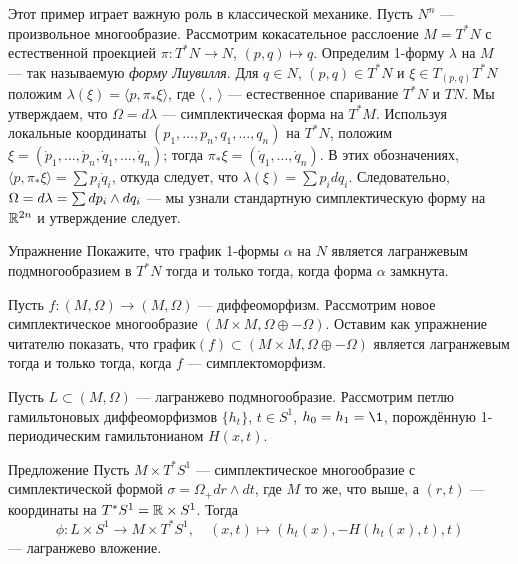 Этот пример играет важную роль в классической механике.
Пусть $N^n$ --- произвольное многообразие.
Рассмотрим кокасательное расслоение $M = T^\ast N$ с естественной проекцией $\pi\colon T^\ast N \to N$, $(p, q) \mapsto q$.
Определим 1-форму $\lambda$ на $M$ --- так называемую \emph{форму Лиувилля}.
Для $q \in N$, $(p, q) \in T^\ast N$ и $\xi \in T_{(p, q)} T^\ast N$ положим $\lambda (\xi) = \langle p, \pi_\ast \xi \rangle$, где $\langle\ ,\ \rangle$ --- естественное спаривание $T^\ast N$ и $TN$.
Мы утверждаем, что $\Omega = d\lambda$ --- симплектическая форма на $T^\ast M$.
Используя локальные координаты $(p_1,\dots, p_n, q_1,\dots, q_n)$ на $T^\ast N$, положим $\xi = (\dot p_1 ,\dots, \dot p_n, \dot q_1,\dots,\dot q_n)$;
тогда $\pi_\ast \xi = (\dot q_1,\dots, \dot q_n)$.
В этих обозначениях, $\langle p, \pi_\ast \xi\rangle=\sum p_i \dot q_i$, откуда следует, что $\lambda (\xi) =\sum p_i dq_i$.
Следовательно, $\Omega = d\lambda =\sum dp_i \z\wedge dq_i$ --- мы узнали стандартную симплектическую форму на $\mathbb{R}^{2n}$ и утверждение следует.

\begin{thm*}{Упражнение}
Покажите, что график 1-формы $\alpha$ на $N$ является лагранжевым подмногообразием в $T^\ast N$ тогда и только тогда, когда форма $\alpha$ замкнута.
\end{thm*}

\begin{thm}{}\label{3.1.D}
\end{thm}

Пусть $f\colon (M, \Omega) \to (M, \Omega)$ --- диффеоморфизм.
Рассмотрим новое симплектическое многообразие $(M \times M, \Omega \oplus -\Omega)$.
Оставим как упражнение читателю показать, что график$(f) \subset (M \times M, \Omega \oplus -\Omega)$ является лагранжевым тогда и только тогда, когда $f$ --- симплектоморфизм.


\begin{thm}{}\label{3.1.E}
\end{thm}

Пусть $L \subset (M, \Omega)$ --- лагранжево подмногообразие.
Рассмотрим петлю гамильтоновых диффеоморфизмов $\{h_t\}$, $t \in S^1$, $h_0 = h_1 = \1$, порождённую 1-периодическим гамильтонианом $H (x, t)$.


\begin{thm*}{Предложение}
Пусть $M \times T^\ast S^1$ --- симплектическое многообразие с симплектической формой $\sigma = \Omega_+ dr \wedge dt$, где $M$ то же, что выше, а $(r, t)$ --- координаты на $T^\ast S^1 = \mathbb{R} \times S^1$.
Тогда
\[\phi\colon L \times S^1 \to M \times T^\ast S^1,
\quad
(x, t) \mapsto (h_t (x), -H (h_t (x), t), t)\]
--- лагранжево вложение.
\end{thm*}

